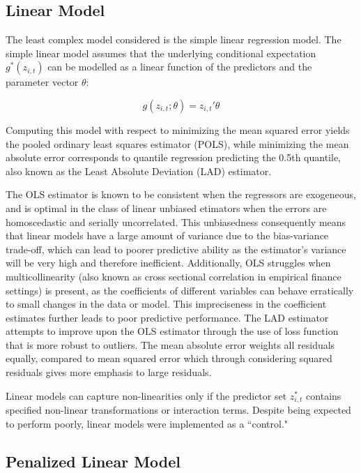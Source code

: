 \documentclass[a4paper, table]{article}
\begin{document}
\subsection{Linear Model}

The least complex model considered is the simple linear regression model. The simple linear model assumes that the underlying conditional expectation \( g^*(z_{i, t}) \) can be modelled as a linear function of the predictors and the parameter vector \( \theta \):

\begin{equation}
	g(z_{i, t};\theta) = z_{i, t}' \theta
\end{equation} 

Computing this model with respect to minimizing the mean squared error yields the pooled ordinary least squares estimator (POLS), while minimizing the mean absolute error corresponds to quantile regression predicting the 0.5th quantile, also known as the Least Absolute Deviation (LAD) estimator. 

The OLS estimator is known to be consistent when the regressors are exogeneous, and is optimal in the class of linear unbiased etimators when the errors are homoscedastic and serially uncorrelated. This unbiasedness consequently means that linear models have a large amount of variance due to the bias-variance trade-off, which can lead to poorer predictive ability as the estimator's variance will be very high and therefore inefficient. Additionally, OLS struggles when multicollinearity (also known as cross sectional correlation in empirical finance settings) is present, as the coefficients of different variables can behave erratically to small changes in the data or model. This impreciseness in the coefficient estimates further leads to poor predictive performance. The LAD estimator attempts to improve upon the OLS estimator through the use of loss function that is more robust to outliers. The mean absolute error weights all residuals equally, compared to mean squared error which through considering squared residuals gives more emphasis to large residuals. 

Linear models can capture non-linearities only if the predictor set \(z^*_{i, t}\) contains specified non-linear transformations or interaction terms. Despite being expected to perform poorly, linear models were implemented as a ``control."

\subsection{Penalized Linear Model}
\end{document}
